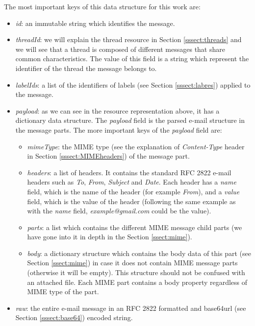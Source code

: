 The most important keys of this data structure for this work are:
\begin{itemize}
	\item\textit{id}: an immutable string which identifies the message.
	\item\textit{threadId}: we will explain the thread resource in Section \ref{sssect:threads} and we will see that a thread is composed of different messages that share common characteristics. The value of this field is a string which represent the identifier of the thread the message belongs to.
	\item\textit{labelIds}: a list of the identifiers of labels (see Section \ref{sssect:labres}) applied to the message.
	\item\textit{payload}: as we can see in the resource representation above, it has a dictionary data structure. The \textit{payload} field is the parsed e-mail structure in the message parts. The more important keys of the \textit{payload} field are:
	\begin{itemize}
		\item\textit{mimeType}: the MIME type (see the explanation of \textit{Content-Type} header in Section \ref{sssect:MIMEheaders}) of the message part.
		\item\textit{headers}: a list of headers. It contains the standard RFC 2822 \citep{rfc2822} e-mail headers such as \textit{To}, \textit{From}, \textit{Subject} and \textit{Date}. Each header has a \textit{name} field, which is the name of the header (for example \textit{From}), and a \textit{value} field, which is the value of the header (following the same example as with the \textit{name} field, \textit{example@gmail.com} could be the value).
		\item\textit{parts}: a list which contains the different MIME message child parts (we have gone into it in depth in the Section \ref{ssect:mime}).
		\item\textit{body}: a dictionary structure which contains the body data of this part (see Section \ref{ssect:mime}) in case it does not contain MIME message parts (otherwise it will be empty). This structure should not be confused with an attached file. Each MIME part contains a body property regardless of MIME type of the part.
	\end{itemize}
	\item\textit{raw}: the entire e-mail message in an RFC 2822 \citep{rfc2822} formatted and base64url (see Section \ref{sssect:base64}) encoded string.
\end{itemize}

